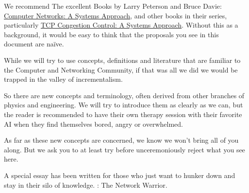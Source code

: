 We recommend The excellent Books by Larry Peterson and Bruce Davie: \href{https://book.systemsapproach.org}{Computer Networks: A Systems Approach}, and other books in their series, particularly \href{https://tcpcc.systemsapproach.org}{TCP Congestion Control: A Systems Approach}.   Without this as a background, it would be easy to think that the proposals you see in this document are naïve.

While we will try to use concepts, definitions and literature that are familiar to the Computer and Networking Community, if that was all we did we would be trapped in the valley of incrementalism.

So there are new concepts and terminology, often derived from other branches of physics and engineering. We will try to introduce them as clearly as we can, but the reader is recommended to have their own therapy session with their favorite AI when they find themselves bored, angry or overwhelmed.

As far as these new concepts are concerned, we know we won't bring all of you along.  But we ask you to at least try before unceremoniously reject what you see here. 

A special essay has been written for those who just want to hunker down and stay in their silo of knowledge.   : The Network Warrior.  